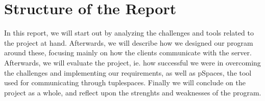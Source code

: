 
\section{Structure of the Report}
In this report, we will start out by analyzing the challenges and tools related to the project at hand. Afterwards, we will describe how we designed our program around these, focusing mainly on how the clients communicate with the server. Afterwards, we will evaluate the project, ie. how successful we were in overcoming the challenges and implementing our requirements, as well as pSpaces, the tool used for communicating through tuplespaces. Finally we will conclude on the project as a whole, and reflect upon the strenghts and weaknesses of the program. 